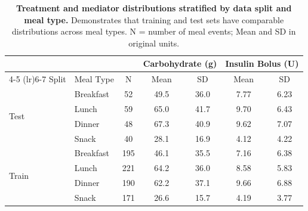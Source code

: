 \begin{table}[ht]
\centering
\small
\caption{\textbf{Treatment and mediator distributions stratified by data split and meal type.}
Demonstrates that training and test sets have comparable distributions across meal types.
N = number of meal events; Mean and SD in original units.}
\label{tab:stratified_split_meal}
\begin{tabular}{llccccc}
\toprule
& & & \multicolumn{2}{c}{Carbohydrate (g)} & \multicolumn{2}{c}{Insulin Bolus (U)} \\
\cmidrule(lr){4-5} \cmidrule(lr){6-7}
Split & Meal Type & N & Mean & SD & Mean & SD \\
\midrule
\multirow{4}{*}{Test} & Breakfast & 52 & 49.5 & 36.0 & 7.77 & 6.23 \\
 & Lunch & 59 & 65.0 & 41.7 & 9.70 & 6.43 \\
 & Dinner & 48 & 67.3 & 40.9 & 9.62 & 7.07 \\
 & Snack & 40 & 28.1 & 16.9 & 4.12 & 4.22 \\
\midrule
\multirow{4}{*}{Train} & Breakfast & 195 & 46.1 & 35.5 & 7.16 & 6.38 \\
 & Lunch & 221 & 64.2 & 36.0 & 8.58 & 5.83 \\
 & Dinner & 190 & 62.2 & 37.1 & 9.66 & 6.88 \\
 & Snack & 171 & 26.6 & 15.7 & 4.19 & 3.77 \\
\bottomrule
\end{tabular}
\end{table}
